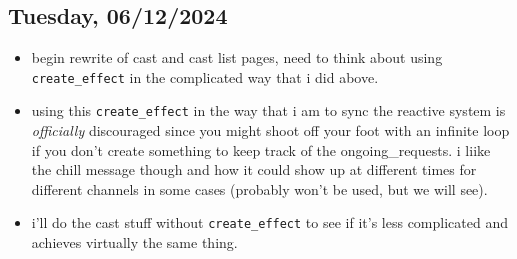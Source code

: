 \subsection*{Tuesday, 06/12/2024}
\begin{itemize}
    \item begin rewrite of cast and cast list pages, need to think about using 
        \texttt{create_effect} in the complicated way that i did above.
    \item using this \texttt{create_effect} in the way that i am to sync the
        reactive system is \textit{officially} discouraged since you might shoot
        off your foot with an infinite loop if you don't create something to
        keep track of the ongoing_requests. i liike the chill message though and
        how it could show up at different times for different channels in some
        cases (probably won't be used, but we will see).
    \item i'll do the cast stuff without \texttt{create_effect} to see
        if it's less complicated and achieves virtually the same thing. 
\end{itemize}
